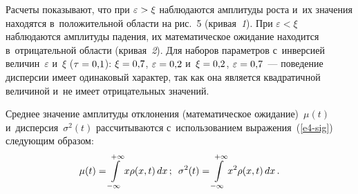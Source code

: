 \begin{multicols}{2}
    Расчеты показывают, что при $\varepsilon\hm> \xi$ наблюдаются 
амплитуды роста и~их значения находятся в~положительной области на рис.~5 
(кривая~\textit{1}). При $\varepsilon<\xi$ наблюдаются амплитуды падения, их 
математическое ожидание находится в~отрицательной области (кривая~\textit{2}). 
Для наборов параметров с~инверсией 
величин~$\varepsilon$ и~$\xi$ ($\tau\hm=0{,}1$): $\xi\hm=0{,}7$, $\varepsilon\hm=0{,}2$ 
и~$\xi\hm=0{,}2$, $\varepsilon\hm=0{,}7$~--- поведение дисперсии имеет одинаковый характер, так как 
она является квадратичной величиной и~не имеет отрицательных значений.
    



    
    Среднее значение амплитуды отклонения (математическое 
ожидание)~$\mu(t)$ и~дисперсия~$\sigma^2(t)$ рассчитываются 
с~использованием выражения~(\ref{e4-sig}) следующим образом: 
    \begin{equation*}
    \mu(t)=\int\limits_{-\infty}^{+\infty} x\rho (x,t)\,dx\,;\enskip
\sigma^2(t)= \int\limits_{-\infty}^{+\infty} x^2\rho(x,t)\,dx\,.
\end{equation*}

\begin{figure*} %
\vspace*{1pt}
\begin{center}
 \mbox{%
 \epsfxsize=163mm 
 }
 \end{center}
\vspace*{-9pt}
\end{figure*}



\end{multicols}
